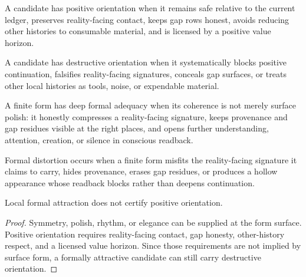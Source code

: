 \begin{definition}
\label{def:philosophy-positive-orientation}
A candidate has positive orientation when it remains safe relative to
the current ledger, preserves reality-facing contact, keeps gap rows
honest, avoids reducing other histories to consumable material, and is
licensed by a positive value horizon.
\end{definition}

\begin{definition}
\label{def:philosophy-destructive-orientation}
A candidate has destructive orientation when it systematically blocks
positive continuation, falsifies reality-facing signatures, conceals
gap surfaces, or treats other local histories as tools, noise, or
expendable material.
\end{definition}

\begin{definition}
\label{def:philosophy-deep-formal-adequacy}
A finite form has deep formal adequacy when its coherence is not merely
surface polish: it honestly compresses a reality-facing signature,
keeps provenance and gap residues visible at the right places, and
opens further understanding, attention, creation, or silence in
conscious readback.
\end{definition}

\begin{definition}
\label{def:philosophy-formal-distortion}
Formal distortion occurs when a finite form misfits the
reality-facing signature it claims to carry, hides provenance, erases
gap residues, or produces a hollow appearance whose readback blocks
rather than deepens continuation.
\end{definition}

\begin{theorem}
\label{thm:philosophy-surface-attraction-not-value}
Local formal attraction does not certify positive orientation.
\end{theorem}
\begin{proof}
Symmetry, polish, rhythm, or elegance can be supplied at the form
surface. Positive orientation requires reality-facing contact, gap
honesty, other-history respect, and a licensed value horizon. Since
those requirements are not implied by surface form, a formally
attractive candidate can still carry destructive orientation.
\end{proof}

